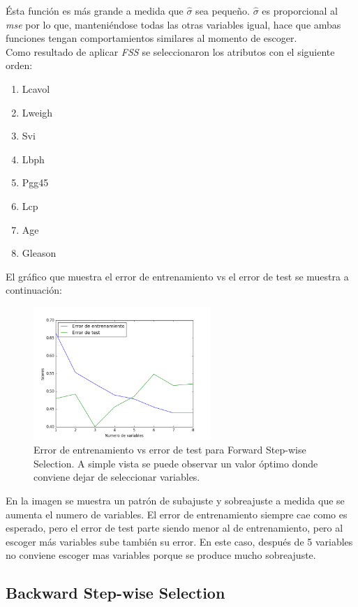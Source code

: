 \documentclass[letter, 10pt]{article}
\begin{document}
Ésta función es más grande a medida que $\hat{\sigma}$ sea pequeño. $\hat{\sigma}$
es proporcional al \textit{mse} por lo que, manteniéndose todas las otras
variables igual, hace que ambas funciones tengan comportamientos similares al
momento de escoger. \\

Como resultado de aplicar \textit{FSS} se seleccionaron los atributos con el
siguiente orden:
\begin{enumerate}
\item Lcavol 
\item Lweigh
\item Svi
\item Lbph
\item Pgg45
\item Lcp
\item Age
\item Gleason   
\end{enumerate}

El gráfico que muestra el error de entrenamiento vs el error de test se
muestra a continuación:

\begin{figure}[H]
  \centering
 \includegraphics[width=0.6\textwidth]{Images/p2_fig1} 
  \caption{Error de entrenamiento vs error de test para Forward Step-wise
    Selection. A simple vista se puede observar un valor óptimo donde conviene
    dejar de seleccionar variables. }
  \label{fig:p2_g1}
\end{figure}

En la imagen se muestra un patrón de subajuste y sobreajuste a medida que se
aumenta el numero de variables. El error de entrenamiento siempre cae como es
esperado, pero el error de test parte siendo menor al de entrenamiento, pero al
escoger más variables sube también su error. En este caso, después de 5
variables no conviene escoger mas variables porque se produce mucho sobreajuste.

\subsection{Backward Step-wise Selection}
\end{document}
